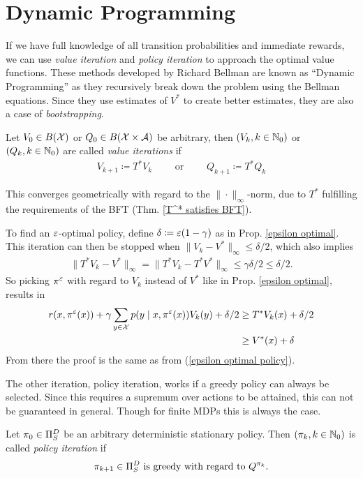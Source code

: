 \section{Dynamic Programming}

If we have full knowledge of all transition probabilities and immediate rewards, we can use \emph{value iteration} and \emph{policy iteration} to approach the optimal value functions. These methods developed by Richard Bellman are known as ``Dynamic Programming'' as they recursively break down the problem using the Bellman equations. Since they use estimates of \(V^*\) to create better estimates, they are also a case of \emph{bootstrapping}.

\begin{definition}Let \(V_0 \in B(\mathcal{X})\) or \(Q_0 \in B(\mathcal{X}\times\mathcal{A})\) be arbitrary, then \((V_k, k\in\mathbb{N}_0)\) or \((Q_k, k\in\mathbb{N}_0)\) are called \emph{value iterations} if
	\begin{align*}
		V_{k+1}\coloneqq T^* V_k \qquad \text{ or }\qquad Q_{k+1}\coloneqq T^* Q_k
	\end{align*}
\end{definition}
This converges geometrically with regard to the \(\|\cdot\|_\infty\)-norm, due to \(T^*\) fulfilling the requirements of the BFT (Thm. \ref{T^* satisfies BFT}). 

To find an \(\varepsilon\)-optimal policy, define \(\delta\coloneqq \varepsilon (1-\gamma)\) as in Prop. \ref{epsilon optimal}. This iteration can then be stopped when \(\|V_k-V^*\|_\infty\le \delta/2\), which also implies
\begin{align*}
	\|T^* V_k - V^*\|_\infty=\|T^*V_{k} -T^*V^*\|_\infty\le \gamma \delta/2 \le \delta/2.
\end{align*}
So picking \(\pi^\varepsilon\) with regard to \(V_k\) instead of \(V^*\) like in Prop. \ref{epsilon optimal}, results in
\begin{align*}
	r(x,\pi^\varepsilon(x))+\gamma \sum_{y\in\mathcal{X}}p(y\mid x, \pi^\varepsilon(x))V_k(y) +\delta/2 
	&\ge T^* V_k(x) + \delta/2 \\
	&\ge V^*(x) + \delta
\end{align*}
From there the proof is the same as from (\ref{epsilon optimal policy}).

The other iteration, policy iteration, works if a greedy policy can always be selected. Since this requires a supremum over actions to be attained, this can not be guaranteed in general. Though for finite MDPs this is always the case. 
 
\begin{definition}\label{policy iteration} Let \(\pi_0\in\Pi_S^D\) be an arbitrary deterministic stationary policy. Then
	\((\pi_k,k\in\mathbb{N}_0)\) is called \emph{policy iteration} if
	\[
		\pi_{k+1}\in\Pi_S^D \text{ is greedy with regard to } Q^{\pi_k}.
	\]
\end{definition}

